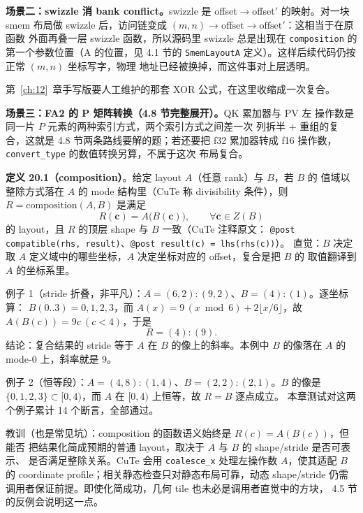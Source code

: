 \textbf{场景二：swizzle 消 bank conflict。}\allowbreak{}swizzle 是
offset$\to$offset$'$ 的映射。对一块 smem 布局做 swizzle 后，访问链变成
$(m,n)\to\mathrm{offset}\to\mathrm{offset}'$：这相当于在原函数
外面再叠一层 swizzle 函数，所以源码里 swizzle 总是出现在
\texttt{composition} 的第一个参数位置（A 的位置，见 4.1 节的
\texttt{SmemLayoutA} 定义）。这样后续代码仍按正常 $(m,n)$ 坐标写字，物理
地址已经被换掉，而这件事对上层透明。

第~\ref{ch:12}~章手写版要人工维护的那套 XOR 公式，在这里收缩成一次复合。

\textbf{场景三：FA2 的 P 矩阵转换（4.8 节完整展开）。}\allowbreak{}QK 累加器与 PV 左
操作数是同一片 $P$ 元素的两种索引方式，两个索引方式之间差一次
列拆半 $+$ 重组的复合，这就是 4.8 节两条路线要解的题；若还要把 f32
累加器转成 f16 操作数，\texttt{convert\_type} 的数值转换另算，不属于这次
布局复合。

\textbf{定义 20.1（composition）}。给定 layout $A$（任意 rank）与 $B$，若 $B$ 的
值域以整除方式落在 $A$ 的 mode 结构里（CuTe 称 divisibility 条件），则
$R=\mathrm{composition}(A,B)$ 是满足
\begin{equation}
  R(\mathbf{c}) = A\bigl(B(\mathbf{c})\bigr), \qquad \forall \mathbf{c}\in Z(B)
  \label{eq:20-compose}
\end{equation}
的 layout，且 $R$ 的顶层 shape 与 $B$ 一致（CuTe 注释原文：
\texttt{@post compatible\allowbreak{}(rhs,\allowbreak{} result)}、\texttt{@post result(c) = lhs(rhs(c))}）。
直觉：$B$ 决定取 $A$ 定义域中的哪些坐标，$A$ 决定坐标对应的 offset，复合是把 $B$ 的
取值翻译到 $A$ 的坐标系里。

例子 1（stride 折叠，非平凡）：$A=(6,2){:}(9,2)$、$B=(4){:}(1)$。逐坐标算：
$B(0..3)=0,1,2,3$，而 $A(x)=9\,(x\bmod6)+2\lfloor x/6\rfloor$，故
$A(B(c))=9c\ (c<4)$，于是
\begin{equation}
  R = (4){:}(9) .
\end{equation}
结论：复合结果的 stride 等于 $A$ 在 $B$ 的像上的斜率。本例中
$B$ 的像落在 $A$ 的 mode-0 上，斜率就是 9。

例子 2（恒等段）：$A=(4,8){:}(1,4)$、$B=(2,2){:}(2,1)$。$B$ 的像是
$\{0,1,2,3\}\subset[0,4)$，而 $A$ 在 $[0,4)$ 上恒等，故 $R=B$ 逐点成立。
本章测试对这两个例子累计 14 个断言，全部通过。

教训（也是常见坑）：composition 的函数语义始终是 $R(c)=A(B(c))$，但能否
把结果化简成预期的普通 layout，取决于 $A$ 与 $B$ 的 shape/stride 是否可表示、
是否满足整除关系。CuTe 会用 \texttt{coalesce\_x} 处理左操作数 $A$，使其适配
$B$ 的 coordinate profile；相关静态检查只对静态布局可靠，动态 shape/stride
仍需调用者保证前提。即使化简成功，几何 tile 也未必是调用者直觉中的方块，
4.5 节的反例会说明这一点。

